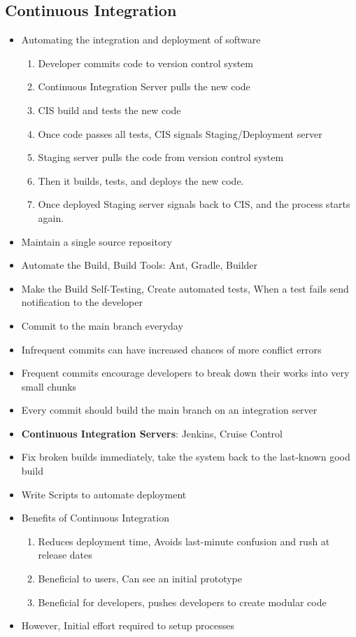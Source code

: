 \documentclass[a4paper]{article}
\begin{document}
\subsection{Continuous Integration}
\begin{itemize}
    \item Automating the integration and deployment of software
    \begin{enumerate}
        \item Developer commits code to version control system
        \item Continuous Integration Server pulls the new code
        \item CIS build and tests the new code
        \item Once code passes all tests, CIS signals Staging/Deployment server
        \item Staging server pulls the code from version control system
        \item Then it builds, tests, and deploys the new code.
        \item Once deployed Staging server signals back to CIS, and the process starts again.
    \end{enumerate}
    \item Maintain a single source repository
    \item Automate the Build, Build Tools: Ant, Gradle, Builder
    \item Make the Build Self-Testing, Create automated tests, When a test fails send notification to the developer
    \item Commit to the main branch everyday
    \item Infrequent commits can have increased chances of more conflict errors
    \item Frequent commits encourage developers to break down their works into very small chunks
    \item Every commit should build the main branch on an integration server
    \item \textbf{Continuous Integration Servers}: Jenkins, Cruise Control
    \item Fix broken builds immediately, take the system back to the last-known good build
    \item Write Scripts to automate deployment
    \item Benefits of Continuous Integration
    \begin{enumerate}
        \item Reduces deployment time, Avoids last-minute confusion and rush at release dates
        \item Beneficial to users, Can see an initial prototype
        \item Beneficial for developers, pushes developers to create modular code
    \end{enumerate}
    \item However, Initial effort required to setup processes
\end{itemize}
\end{document}
